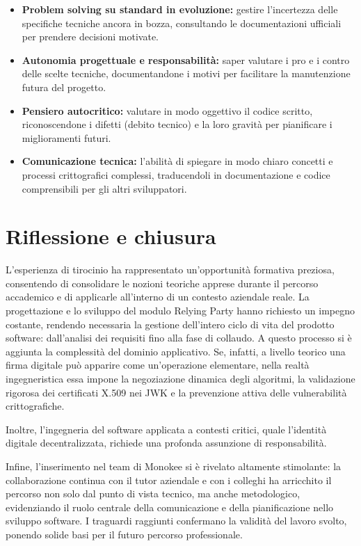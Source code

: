 \begin{itemize}
    \item \textbf{Problem solving su standard in evoluzione:} gestire l'incertezza delle specifiche tecniche ancora in bozza, consultando le documentazioni ufficiali per prendere decisioni motivate.
    \item \textbf{Autonomia progettuale e responsabilità:} saper valutare i pro e i contro delle scelte tecniche, documentandone i motivi per facilitare la manutenzione futura del progetto.
    \item \textbf{Pensiero autocritico:} valutare in modo oggettivo il codice scritto, riconoscendone i difetti (debito tecnico) e la loro gravità per pianificare i miglioramenti futuri.
    \item \textbf{Comunicazione tecnica:} l'abilità di spiegare in modo chiaro concetti e processi crittografici complessi, traducendoli in documentazione e codice comprensibili per gli altri sviluppatori.
\end{itemize}

\section{Riflessione e chiusura}
L'esperienza di tirocinio ha rappresentato un'opportunità formativa preziosa, consentendo di consolidare le nozioni teoriche apprese durante il percorso accademico e di applicarle all'interno di un contesto aziendale reale. La progettazione e lo sviluppo del modulo Relying Party hanno richiesto un impegno costante, rendendo necessaria la gestione dell'intero ciclo di vita del prodotto software: dall'analisi dei requisiti fino alla fase di collaudo. A questo processo si è aggiunta la complessità del dominio applicativo. Se, infatti, a livello teorico una firma digitale può apparire come un'operazione elementare, nella realtà ingegneristica essa impone la negoziazione dinamica degli algoritmi, la validazione rigorosa dei certificati X.509 nei JWK e la prevenzione attiva delle vulnerabilità crittografiche.

Inoltre, l'ingegneria del software applicata a contesti critici, quale l'identità digitale decentralizzata, richiede una profonda assunzione di responsabilità.

Infine, l'inserimento nel team di Monokee si è rivelato altamente stimolante: la collaborazione continua con il tutor aziendale e con i colleghi ha arricchito il percorso non solo dal punto di vista tecnico, ma anche metodologico, evidenziando il ruolo centrale della comunicazione e della pianificazione nello sviluppo software. I traguardi raggiunti confermano la validità del lavoro svolto, ponendo solide basi per il futuro percorso professionale.

